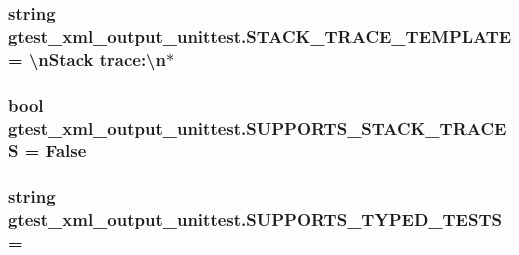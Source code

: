 \subsubsection[{\texorpdfstring{S\+T\+A\+C\+K\+\_\+\+T\+R\+A\+C\+E\+\_\+\+T\+E\+M\+P\+L\+A\+TE}{STACK_TRACE_TEMPLATE}}]{\setlength{\rightskip}{0pt plus 5cm}string gtest\+\_\+xml\+\_\+output\+\_\+unittest.\+S\+T\+A\+C\+K\+\_\+\+T\+R\+A\+C\+E\+\_\+\+T\+E\+M\+P\+L\+A\+TE = \textquotesingle{}\textbackslash{}n\+Stack trace\+:\textbackslash{}n$\ast$\textquotesingle{}}\hypertarget{namespacegtest__xml__output__unittest_abd57c1a4124b74d2ba63d03734df491d}{}\label{namespacegtest__xml__output__unittest_abd57c1a4124b74d2ba63d03734df491d}
\subsubsection[{\texorpdfstring{S\+U\+P\+P\+O\+R\+T\+S\+\_\+\+S\+T\+A\+C\+K\+\_\+\+T\+R\+A\+C\+ES}{SUPPORTS_STACK_TRACES}}]{\setlength{\rightskip}{0pt plus 5cm}bool gtest\+\_\+xml\+\_\+output\+\_\+unittest.\+S\+U\+P\+P\+O\+R\+T\+S\+\_\+\+S\+T\+A\+C\+K\+\_\+\+T\+R\+A\+C\+ES = False}\hypertarget{namespacegtest__xml__output__unittest_af342633908d453cee6e700fe6b73ef82}{}\label{namespacegtest__xml__output__unittest_af342633908d453cee6e700fe6b73ef82}
\subsubsection[{\texorpdfstring{S\+U\+P\+P\+O\+R\+T\+S\+\_\+\+T\+Y\+P\+E\+D\+\_\+\+T\+E\+S\+TS}{SUPPORTS_TYPED_TESTS}}]{\setlength{\rightskip}{0pt plus 5cm}string gtest\+\_\+xml\+\_\+output\+\_\+unittest.\+S\+U\+P\+P\+O\+R\+T\+S\+\_\+\+T\+Y\+P\+E\+D\+\_\+\+T\+E\+S\+TS = \textquotesingle{}}\hypertarget{namespacegtest__xml__output__unittest_a07eecd027d660022c0ab447f3c3e0f2e}{}\label{namespacegtest__xml__output__unittest_a07eecd027d660022c0ab447f3c3e0f2e}
